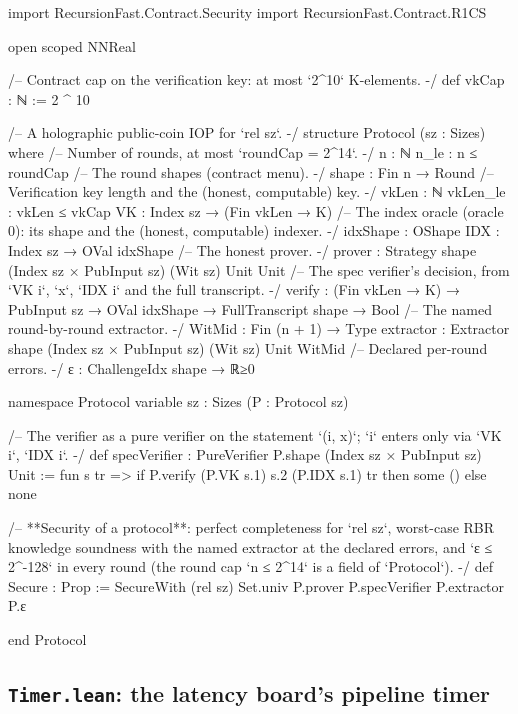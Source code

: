 \begin{leancode}[fontsize=\scriptsize,label={\footnotesize Contract/Protocol.lean}]
import RecursionFast.Contract.Security
import RecursionFast.Contract.R1CS

open scoped NNReal

/-- Contract cap on the verification key: at most `2^10` K-elements. -/
def vkCap : ℕ := 2 ^ 10

/-- A holographic public-coin IOP for `rel sz`. -/
structure Protocol (sz : Sizes) where
  /-- Number of rounds, at most `roundCap = 2^14`. -/
  n : ℕ
  n_le : n ≤ roundCap
  /-- The round shapes (contract menu). -/
  shape : Fin n → Round
  /-- Verification key length and the (honest, computable) key. -/
  vkLen : ℕ
  vkLen_le : vkLen ≤ vkCap
  VK : Index sz → (Fin vkLen → K)
  /-- The index oracle (oracle 0): its shape and the (honest, computable) indexer. -/
  idxShape : OShape
  IDX : Index sz → OVal idxShape
  /-- The honest prover. -/
  prover : Strategy shape (Index sz × PubInput sz) (Wit sz) Unit Unit
  /-- The spec verifier's decision, from `VK i`, `x`, `IDX i` and the full transcript. -/
  verify : (Fin vkLen → K) → PubInput sz → OVal idxShape → FullTranscript shape → Bool
  /-- The named round-by-round extractor. -/
  WitMid : Fin (n + 1) → Type
  extractor : Extractor shape (Index sz × PubInput sz) (Wit sz) Unit WitMid
  /-- Declared per-round errors. -/
  ε : ChallengeIdx shape → ℝ≥0

namespace Protocol
variable {sz : Sizes} (P : Protocol sz)

/-- The verifier as a pure verifier on the statement `(i, x)`; `i` enters only via `VK i`, `IDX i`. -/
def specVerifier : PureVerifier P.shape (Index sz × PubInput sz) Unit :=
  fun s tr => if P.verify (P.VK s.1) s.2 (P.IDX s.1) tr then some () else none

/-- **Security of a protocol**: perfect completeness for `rel sz`, worst-case RBR knowledge
soundness with the named extractor at the declared errors, and `ε ≤ 2^-128` in every round
(the round cap `n ≤ 2^14` is a field of `Protocol`). -/
def Secure : Prop :=
  SecureWith (rel sz) Set.univ P.prover P.specVerifier P.extractor P.ε

end Protocol
\end{leancode}

\subsection{\texttt{Timer.lean}: the latency board's pipeline timer}

